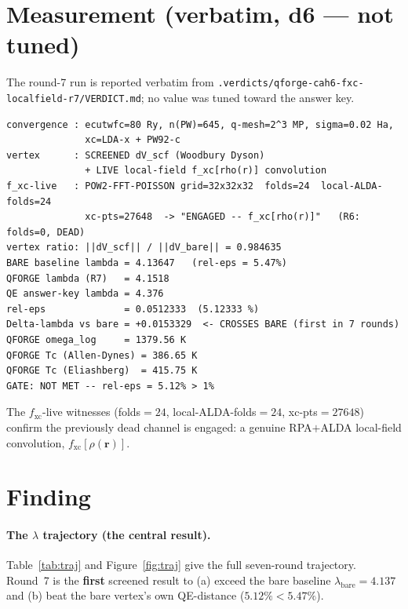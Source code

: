 \documentclass[11pt,a4paper]{article}
\begin{document}
\section{Measurement (verbatim, d6 --- not tuned)}
\label{sec:measurement}

The round-7 run is reported verbatim from
\texttt{.verdicts/qforge-cah6-fxc-localfield-r7/VERDICT.md}; no value was
tuned toward the answer key.

\begin{lstlisting}[basicstyle=\ttfamily\small,frame=single,breaklines=true]
convergence : ecutwfc=80 Ry, n(PW)=645, q-mesh=2^3 MP, sigma=0.02 Ha,
              xc=LDA-x + PW92-c
vertex      : SCREENED dV_scf (Woodbury Dyson)
              + LIVE local-field f_xc[rho(r)] convolution
f_xc-live   : POW2-FFT-POISSON grid=32x32x32  folds=24  local-ALDA-folds=24
              xc-pts=27648  -> "ENGAGED -- f_xc[rho(r)]"   (R6: folds=0, DEAD)
vertex ratio: ||dV_scf|| / ||dV_bare|| = 0.984635
BARE baseline lambda = 4.13647   (rel-eps = 5.47%)
QFORGE lambda (R7)   = 4.1518
QE answer-key lambda = 4.376
rel-eps              = 0.0512333  (5.12333 %)
Delta-lambda vs bare = +0.0153329  <- CROSSES BARE (first in 7 rounds)
QFORGE omega_log     = 1379.56 K
QFORGE Tc (Allen-Dynes) = 386.65 K
QFORGE Tc (Eliashberg)  = 415.75 K
GATE: NOT MET -- rel-eps = 5.12% > 1%
\end{lstlisting}

The $f_{\mathrm{xc}}$-live witnesses (folds$=24$, local-ALDA-folds$=24$,
xc-pts$=27648$) confirm the previously dead channel is engaged: a genuine
RPA$+$ALDA local-field convolution, $f_{\mathrm{xc}}[\rho(\mathbf{r})]$.

\section{Finding}
\label{sec:finding}

\paragraph{The $\lambda$ trajectory (the central result).}
Table~\ref{tab:traj} and Figure~\ref{fig:traj} give the full seven-round
trajectory. Round~7 is the \textbf{first} screened result to (a) exceed the
bare baseline $\lambda_{\mathrm{bare}}=4.137$ and (b) beat the bare vertex's
own QE-distance ($5.12\% < 5.47\%$).
\end{document}
